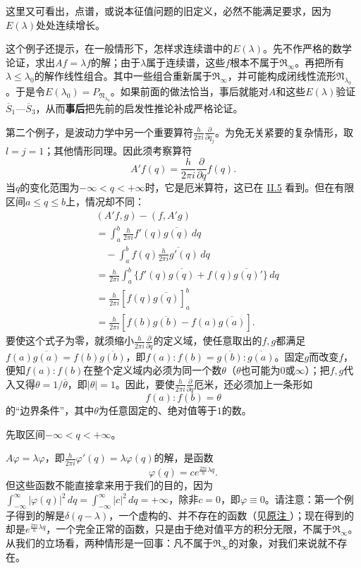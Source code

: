 \documentclass[fontsize=13pt,twoside,openany,headings=normal,parskip=false,bookmarkpackage=false,DIV=calc]{scrbook}
\begin{document}
\hypertarget{origpage-68}{}\label{origpage-68}这里又可看出，点谱，或说本征值问题的旧定义，必然不能满足要求，因为$E(\lambda)$处处连续增长。

这个例子还提示，在一般情形下，怎样求连续谱中的$E(\lambda)$。先不作严格的数学论证，求出$Af=\lambda f$的解；由于$\lambda$属于连续谱，这些$f$根本不属于$\mathfrak{R}_\infty$。再把所有$\lambda\leq\lambda_0$的解作线性组合。其中一些组合重新属于$\mathfrak{R}_\infty$，并可能构成闭线性流形$\mathfrak{N}_{\lambda_0}$。于是令$E(\lambda_0)=P_{\mathfrak{N}_{\lambda_0}}$。如果前面的做法恰当，事后就能对$A$和这些$E(\lambda)$验证$\hyperref[cond:II.Sbar1]{\overline{S}_1}$—$\hyperref[cond:II.Sbar3]{\overline{S}_3}$，从而\textbf{事后}把先前的启发性推论补成严格论证。

第二个例子，是波动力学中另一个重要算符$\frac{h}{2\pi i}\frac{\partial}{\partial q_j}$。为免无关紧要的复杂情形，取$l=j=1$；其他情形同理。因此须考察算符
\[
A'f(q)=\frac{h}{2\pi i}\frac{\partial}{\partial q}f(q).
\]
当$q$的变化范围为$-\infty<q<+\infty$时，它是厄米算符，这已在 \hyperref[sec:II.5]{II.5} 看到。但在有限区间$a\leq q\leq b$上，情况却不同：
\begin{align*}
&(A'f,g)-(f,A'g)\\
&=\int_a^b\frac{h}{2\pi i}f'(q)\overline{g(q)}\,dq\\
&\quad-\int_a^b f(q)\overline{\frac{h}{2\pi i}g'(q)}\,dq\\
&=\frac{h}{2\pi i}\int_a^b\{f'(q)\overline{g(q)}+f(q)\overline{g(q)}'\}\,dq\\
&=\frac{h}{2\pi i}[f(q)\overline{g(q)}]_a^b\\
&=\frac{h}{2\pi i}[f(b)\overline{g(b)}-f(a)\overline{g(a)}].
\end{align*}
要使这个式子为零，就须缩小$\frac{h}{2\pi i}\frac{\partial}{\partial q}$的定义域，使任意取出的$f,\allowbreak g$都满足$f(a)\overline{g(a)}=f(b)\overline{g(b)}$，即$f(a):f(b)=\overline{g(b)}:\overline{g(a)}$。固定$g$而改变$f$，便知$f(a):f(b)$在整个定义域内必须为同一个数$\theta$（$\theta$也可能为$0$或$\infty$）；把$f,\allowbreak g$代入又得$\theta=1/\overline\theta$，即$|\theta|=1$。因此，要使$\frac{h}{2\pi i}\frac{\partial}{\partial q}$厄米，还必须加上一条形如
\[
f(a):f(b)=\theta
\]
的“边界条件”，其中$\theta$为任意固定的、绝对值等于$1$的数。

先取区间$-\infty<q<+\infty$。

\hypertarget{origpage-69}{}\label{origpage-69}$A\varphi=\lambda\varphi$，即$\frac{h}{2\pi i}\varphi'(q)=\lambda\varphi(q)$的解，是函数
\[
\varphi(q)=c e^{\frac{2\pi i}{h}\lambda q}.
\]
但这些函数不能直接拿来用于我们的目的，因为$\int_{-\infty}^{\infty}|\varphi(q)|^2\,dq=\int_{-\infty}^{\infty}|c|^2\,dq=+\infty$，除非$c=0$，即$\varphi\equiv0$。请注意：第一个例子得到的解是$\delta(q-\lambda)$，一个虚构的、并不存在的函数（见\CJKglue \hyperlink{note-84}{原注 }）；现在得到的却是$e^{\frac{2\pi i}{h}\lambda q}$，一个完全正常的函数，只是由于绝对值平方的积分无限，不属于$\mathfrak{R}_\infty$。从我们的立场看，两种情形是一回事：凡不属于$\mathfrak{R}_\infty$的对象，对我们来说就不存在。
\end{document}
